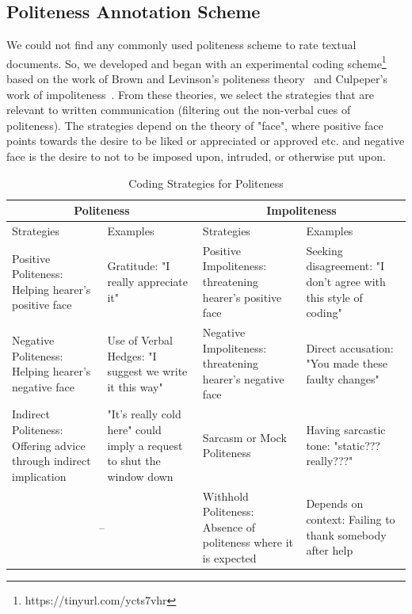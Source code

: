 \subsection{Politeness Annotation Scheme}\label{polscheme}

We could not find any commonly used politeness scheme 
to rate textual documents. 
So, we developed and began with an experimental coding scheme\footnote{https://tinyurl.com/ycts7vhr} 
based on the work of 
Brown and Levinson's politeness theory~\cite{brown1987politeness} 
and Culpeper's work of impoliteness~\cite{culpeper1996towards}. 
From these theories, 
we select the strategies that are relevant to written communication (filtering out the non-verbal cues of politeness). 
The strategies depend on the theory of "face", 
where positive face points towards the desire 
to be liked or appreciated or approved etc. 
and negative face is the desire 
to not to be imposed upon, intruded, or otherwise put upon.

\FloatBarrier
\begin{table}[H]
	\centering
	\caption{Coding Strategies for Politeness}
	\label{poltable}
	\begin{tabular}{ | m{1.75cm} | m{2cm}|| m{2cm} | m{1.75cm} | }
		\hline
		\multicolumn{2}{|c||}{Politeness} & \multicolumn{2}{c|}{Impoliteness} \\
		\hline
		Strategies & Examples & Strategies & Examples \\ 
		\hline
		Positive Politeness: Helping hearer's positive face  & Gratitude: "I really appreciate it" & Positive Impoliteness: threatening hearer's positive face & Seeking disagreement: "I don't agree with this style of coding" \\
		\hline
		Negative Politeness: Helping hearer's negative face & Use of Verbal Hedges: "I suggest we write it this way" & Negative Impoliteness: threatening hearer's negative face  & Direct accusation: "You made these faulty changes"\\
		\hline
		Indirect Politeness: Offering advice through indirect implication & "It's really cold here" could imply a request to shut the window down & Sarcasm or Mock Politeness & Having sarcastic tone: "static??? really???" \\
		\hline
		\multicolumn{2}{c|}{--} & Withhold Politeness:\tablefootnote{Excluded in the modified scheme after the experiment} Absence of politeness where it is expected & Depends on context: Failing to thank somebody after help\\
		\cline{3-4}
	\end{tabular}
\end{table}

